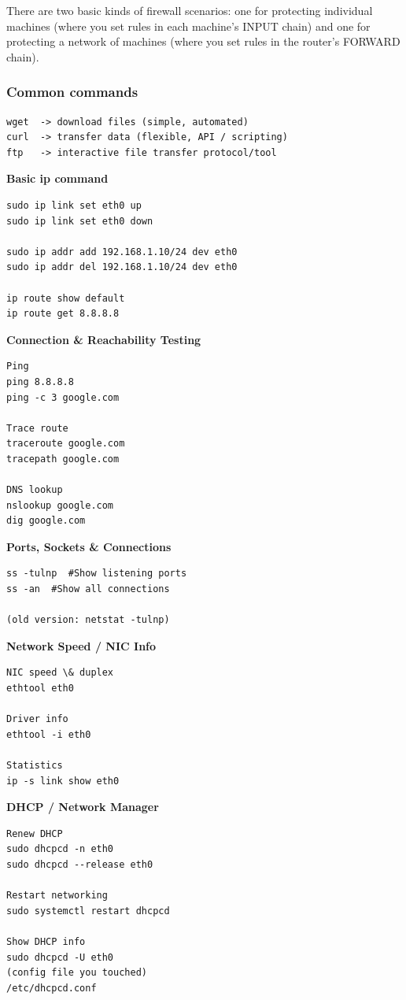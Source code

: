 \documentclass[paper=8.5in:11in, twoside, 12pt, pagesize=pdftex]{book}
\begin{document}
\par There are two basic kinds of firewall scenarios: one for protecting individual machines (where you set rules in each machine’s INPUT chain) and one for protecting a network of machines (where you set rules in the router’s FORWARD chain).


\subsubsection{Common commands}
\begin{lstlisting}
wget  -> download files (simple, automated)
curl  -> transfer data (flexible, API / scripting)
ftp   -> interactive file transfer protocol/tool
\end{lstlisting}


\textbf{Basic ip command}
\begin{lstlisting}
sudo ip link set eth0 up
sudo ip link set eth0 down

sudo ip addr add 192.168.1.10/24 dev eth0
sudo ip addr del 192.168.1.10/24 dev eth0

ip route show default
ip route get 8.8.8.8
\end{lstlisting}


\textbf{Connection \& Reachability Testing}
\begin{lstlisting}
Ping
ping 8.8.8.8
ping -c 3 google.com

Trace route
traceroute google.com
tracepath google.com

DNS lookup
nslookup google.com
dig google.com
\end{lstlisting}

\textbf{Ports, Sockets \& Connections}
\begin{lstlisting}
ss -tulnp  #Show listening ports
ss -an  #Show all connections

(old version: netstat -tulnp)
\end{lstlisting}


\textbf{Network Speed / NIC Info}
\begin{lstlisting}
NIC speed \& duplex
ethtool eth0

Driver info
ethtool -i eth0

Statistics
ip -s link show eth0
\end{lstlisting}

\textbf{DHCP / Network Manager}
\begin{lstlisting}
Renew DHCP
sudo dhcpcd -n eth0
sudo dhcpcd --release eth0

Restart networking
sudo systemctl restart dhcpcd

Show DHCP info
sudo dhcpcd -U eth0
(config file you touched)
/etc/dhcpcd.conf
\end{lstlisting}
\end{document}
